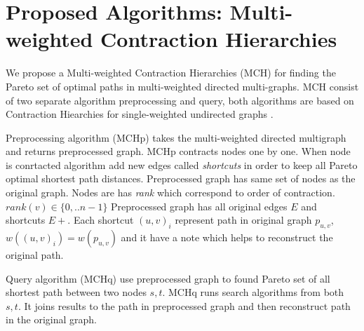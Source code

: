 
\section{Proposed Algorithms: Multi-weighted Contraction Hierarchies}
\label{secAlgorithms}

We propose a Multi-weighted Contraction Hierarchies (MCH) for finding the Pareto set
of optimal paths in multi-weighted directed multi-graphs. 
MCH consist of two separate algorithm preprocessing and query,
both algorithms are based on Contraction Hiearchies 
for single-weighted undirected graphs \cite{geisberger2008contraction}.


Preprocessing algorithm (MCHp) takes the multi-weighted directed multigraph
and returns preprocessed graph. MCHp contracts nodes one by one. 
When node is conrtacted algorithm add new edges called \emph{shortcuts} in order
to keep all Pareto optimal shortest path distances. 
Preprocessed graph has same set of nodes as the original graph.
Nodes are has \emph{rank} which correspond to order of contraction.
$rank(v) \in \{0,..n-1\}$
Preprocessed graph has all original edges $E$ and shortcuts $E+$.
Each shortcut $(u,v)_i$ represent 
path in original graph $p_{u,v}$, $w((u,v)_i) = w(p_{u,v})$ and it have a note which helps
to reconstruct the original path.

Query algorithm (MCHq) use preprocessed graph to found Pareto set of all
shortest path between two nodes $s, t$. MCHq runs search algorithms
from both $s, t$. 
It joins results to the path in preprocessed graph 
and then reconstruct path in the original graph.




